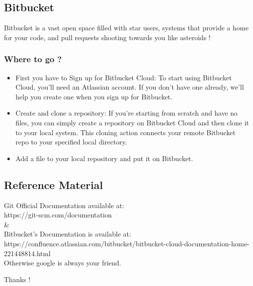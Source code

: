 \documentclass[a4paper, 12pt]{article}
\begin{document}
\subsection{Bitbucket}
Bitbucket is a vast open space filled with star users, systems that provide a home for your code, and pull requests shooting towards you like asteroids !

\subsubsection{Where to go ?}
\begin{itemize}
\item First you have to Sign up for Bitbucket Cloud: To start using Bitbucket Cloud, you’ll need an Atlassian account. If you don’t have one already, we’ll help you create one when you sign up for Bitbucket.
\item Create and clone a repository: If you’re starting from scratch and have no files, you can simply create a repository on Bitbucket Cloud and then clone it to your local system. This cloning action connects your remote Bitbucket repo to your specified local directory.
\item Add a file to your local repository and put it on Bitbucket.
\end{itemize}

\subsection{Reference Material}
Git Official Documentation available at: \\
https://git-scm.com/documentation \\
\& \\
Bitbucket's Documentation is available at: \\
https://confluence.atlassian.com/bitbucket/bitbucket-cloud-documentation-home-221448814.html \\
Otherwise google is always your friend.

\begin{center}
Thanks !
\end{center}
\end{document}
